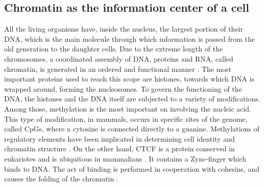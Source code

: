 \subsection{Chromatin as the information center of a cell}
All the living organisms have, inside the nucleus, the largest portion of their DNA, which is the main molecule through which information is passed from the old generation to the daughter cells. Due to the extreme length of the chromosomes, a coordinated assembly of DNA, proteins and RNA, called chromatin, is generated in an ordered and functional manner
\cite{paroBiologyChromatin2021}. 
The most important proteins used to reach this scope are histones, towards which DNA is wrapped around, forming the nucleosomes. To govern the functioning of the DNA, the histones and the DNA itself are subjected to a variety of modifications. Among those, methylation is the most important on  involving the nucleic acid. This type of modification, in mammals, occurs in specific sites of the genome, called CpGs, where a cytosine is connected directly to a guanine. Methylations of regulatory elements have been implicated in determining cell identity and chromatin structure
\cite{liauAdaptiveChromatinRemodeling2017a, shareefExtendedrepresentationBisulfiteSequencing2021}. 
On the other hand, CTCF is a protein conserved in eukariotes and is ubiquitous in mammalians
\cite{kimCTCFMultifunctionalProtein2015a}. 
It contains a Zync-finger which binds to DNA. The act of binding is performed in cooperation with cohesins, and causes the folding of the chromatin
\cite{hsiehEnhancerPromoterInteractions2022,kimCTCFMultifunctionalProtein2015a}.

